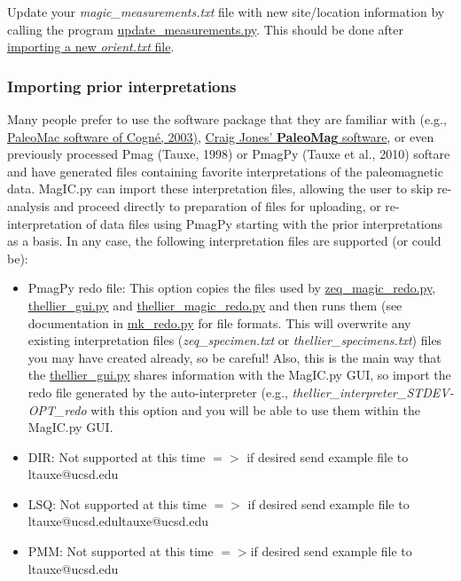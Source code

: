 \documentclass[11pt]{book}
\begin{document}
{Update your {\it magic\_measurements.txt} file with new site/location information by calling the program \href{#update_measurements.py}{update\_measurements.py}.  This should be done after \href{#ImportOrient}{importing a new {\it orient.txt} file}.  


\subsubsection{Importing prior interpretations}
Many people prefer to use the software package that they are familiar with (e.g., \href{#PMD_magic.py}{PaleoMac software of Cogn\'e, 2003)}, \nocite{cogne03}  \href{#CIT_magic.py}{Craig Jones' {\bf PaleoMag} software},  or even previously processed Pmag (Tauxe, 1998) or PmagPy (Tauxe et al., 2010) softare and have generated files containing favorite interpretations of the paleomagnetic data.  MagIC.py can import these interpretation files, allowing the user to skip re-analysis and proceed directly to preparation of files for uploading, or re-interpretation of data files using PmagPy starting with the prior interpretations as a basis.    In any case, the following interpretation files are supported (or could be): 

\begin{itemize}
\item {PmagPy redo file}:   This option copies the files used by \href{#zeq_redo.py}{zeq\_magic\_redo.py}, \href{#thellier_gui.py}{thellier\_gui.py}  and \href{#thellier_magic_redo.py}{thellier\_magic\_redo.py} and then runs them (see documentation in \href{#mk_redo.py}{mk\_redo.py} for file formats.  This will overwrite any existing interpretation files ({\it zeq\_specimen.txt} or {\it thellier\_specimens.txt}) files you may have created already, so be careful!  Also, this is the main way that the  \href{#thellier_gui.py}{thellier\_gui.py} shares information with the MagIC.py GUI, so import the redo file generated by the auto-interpreter (e.g., {\it thellier\_interpreter\_STDEV-OPT\_redo}  with this option and you will be able to use them within the MagIC.py GUI.  
\item DIR:  Not supported at this time $=>$ if desired send example file to {ltauxe@ucsd.edu}
\item LSQ:  Not supported at this time $=>$ if desired send example file to {ltauxe@ucsd.edu}{ltauxe@ucsd.edu}
\item PMM: Not supported at this time  $=>$if desired send example file to {ltauxe@ucsd.edu}


\end{itemize}}
\end{document}
